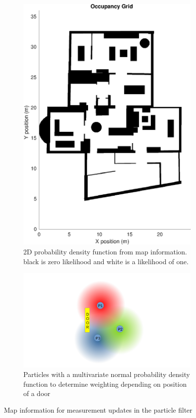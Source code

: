 \begin{enumerate}
	\begin{figure}[]
		\centering
		\begin{subfigure}[t]{.4\textwidth}
			\centering
			\includegraphics[width=0.7\linewidth]{images/20201030_1157_pf_map_1}
			\caption{2D probability density function from map information. black is zero likelihood and white is a likelihood of one.}
			\label{fig:pf_walls}
		\end{subfigure} \quad
		\begin{subfigure}[t]{0.4\textwidth}
			\centering
			\includegraphics[trim=240 0 220 0, clip, width=0.7\linewidth]{images/pf_diagram}
			\caption{ Particles with a multivariate normal probability density function to determine weighting depending on position of a door}
			\label{fig:pfdiagram}
		\end{subfigure}
		\caption[Map information use in Particle Filter]{Map information for measurement updates in the particle filter}
		\label{fig:pf_meas_update}
	\end{figure}
	

\end{enumerate}
